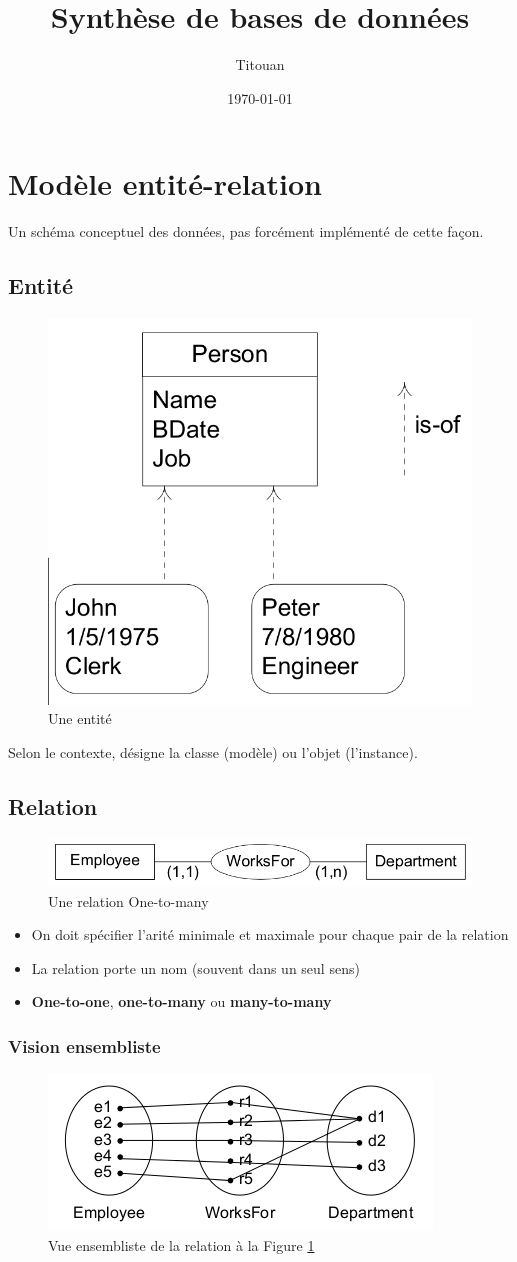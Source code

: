 \documentclass[a4paper]{article}
\author{Titouan \bsc{Christophe}}
\title{Synthèse de bases de données}
\date{\today}
\begin{document}
\maketitle
\tableofcontents

\section{Modèle entité-relation}
Un schéma conceptuel des données, pas forcément implémenté de cette façon.

\subsection{Entité}
\begin{figure}[h!]
    \center
    \includegraphics[width=.3\textwidth]{fig/entity.png}
    \caption{Une entité}
\end{figure}

Selon le contexte, désigne la classe (modèle) ou l'objet (l'instance).

\subsection{Relation}
\begin{figure}[h!]
    \center
    \includegraphics[width=.7\textwidth]{fig/relation.png}
    \caption{\label{fig:relation}Une relation One-to-many}
\end{figure}
\begin{itemize}
  \item On doit spécifier l'arité minimale et maximale pour chaque pair de la relation
  \item La relation porte un nom (souvent dans un seul sens)
  \item \textbf{One-to-one}, \textbf{one-to-many} ou \textbf{many-to-many}
\end{itemize}
\subsubsection{Vision ensembliste}
\begin{figure}[h!]
    \center
    \includegraphics[width=.3\textwidth]{fig/relation-ensembliste.png}
    \caption{Vue ensembliste de la relation à la Figure \ref{fig:relation}}
\end{figure}
\end{document}
